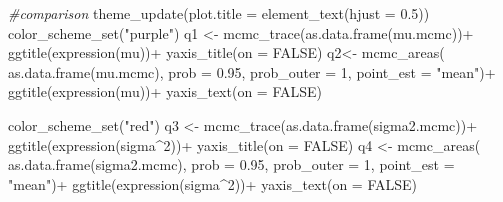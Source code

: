 \documentclass[
  11pt,
]{article}
\newenvironment{Shaded}{\begin{snugshade}}{\end{snugshade}}
\newcommand{\AttributeTok}[1]{\textcolor[rgb]{0.77,0.63,0.00}{#1}}
\newcommand{\CommentTok}[1]{\textcolor[rgb]{0.56,0.35,0.01}{\textit{#1}}}
\newcommand{\ConstantTok}[1]{\textcolor[rgb]{0.00,0.00,0.00}{#1}}
\newcommand{\DecValTok}[1]{\textcolor[rgb]{0.00,0.00,0.81}{#1}}
\newcommand{\FloatTok}[1]{\textcolor[rgb]{0.00,0.00,0.81}{#1}}
\newcommand{\FunctionTok}[1]{\textcolor[rgb]{0.00,0.00,0.00}{#1}}
\newcommand{\NormalTok}[1]{#1}
\newcommand{\OtherTok}[1]{\textcolor[rgb]{0.56,0.35,0.01}{#1}}
\newcommand{\SpecialCharTok}[1]{\textcolor[rgb]{0.00,0.00,0.00}{#1}}
\newcommand{\StringTok}[1]{\textcolor[rgb]{0.31,0.60,0.02}{#1}}
\begin{document}
\begin{Shaded}
\begin{Highlighting}[]
\CommentTok{\#comparison}
\FunctionTok{theme\_update}\NormalTok{(}\AttributeTok{plot.title =} \FunctionTok{element\_text}\NormalTok{(}\AttributeTok{hjust =} \FloatTok{0.5}\NormalTok{))}
\FunctionTok{color\_scheme\_set}\NormalTok{(}\StringTok{"purple"}\NormalTok{)}
\NormalTok{q1 }\OtherTok{\textless{}{-}} \FunctionTok{mcmc\_trace}\NormalTok{(}\FunctionTok{as.data.frame}\NormalTok{(mu.mcmc))}\SpecialCharTok{+}
  \FunctionTok{ggtitle}\NormalTok{(}\FunctionTok{expression}\NormalTok{(mu))}\SpecialCharTok{+}
  \FunctionTok{yaxis\_title}\NormalTok{(}\AttributeTok{on =} \ConstantTok{FALSE}\NormalTok{)}
\NormalTok{q2}\OtherTok{\textless{}{-}} \FunctionTok{mcmc\_areas}\NormalTok{(}
  \FunctionTok{as.data.frame}\NormalTok{(mu.mcmc), }
  \AttributeTok{prob =} \FloatTok{0.95}\NormalTok{,}
  \AttributeTok{prob\_outer =} \DecValTok{1}\NormalTok{, }
  \AttributeTok{point\_est =} \StringTok{"mean"}\NormalTok{)}\SpecialCharTok{+}
  \FunctionTok{ggtitle}\NormalTok{(}\FunctionTok{expression}\NormalTok{(mu))}\SpecialCharTok{+}
  \FunctionTok{yaxis\_text}\NormalTok{(}\AttributeTok{on =} \ConstantTok{FALSE}\NormalTok{)}

\FunctionTok{color\_scheme\_set}\NormalTok{(}\StringTok{"red"}\NormalTok{)}
\NormalTok{q3 }\OtherTok{\textless{}{-}} \FunctionTok{mcmc\_trace}\NormalTok{(}\FunctionTok{as.data.frame}\NormalTok{(sigma2.mcmc))}\SpecialCharTok{+}
  \FunctionTok{ggtitle}\NormalTok{(}\FunctionTok{expression}\NormalTok{(sigma}\SpecialCharTok{\^{}}\DecValTok{2}\NormalTok{))}\SpecialCharTok{+}
  \FunctionTok{yaxis\_title}\NormalTok{(}\AttributeTok{on =} \ConstantTok{FALSE}\NormalTok{)}
\NormalTok{q4 }\OtherTok{\textless{}{-}} \FunctionTok{mcmc\_areas}\NormalTok{(}
  \FunctionTok{as.data.frame}\NormalTok{(sigma2.mcmc), }
  \AttributeTok{prob =} \FloatTok{0.95}\NormalTok{, }
  \AttributeTok{prob\_outer =} \DecValTok{1}\NormalTok{, }
  \AttributeTok{point\_est =} \StringTok{"mean"}\NormalTok{)}\SpecialCharTok{+}
  \FunctionTok{ggtitle}\NormalTok{(}\FunctionTok{expression}\NormalTok{(sigma}\SpecialCharTok{\^{}}\DecValTok{2}\NormalTok{))}\SpecialCharTok{+}
  \FunctionTok{yaxis\_text}\NormalTok{(}\AttributeTok{on =} \ConstantTok{FALSE}\NormalTok{)}


\end{Highlighting}
\end{Shaded}
\end{document}
